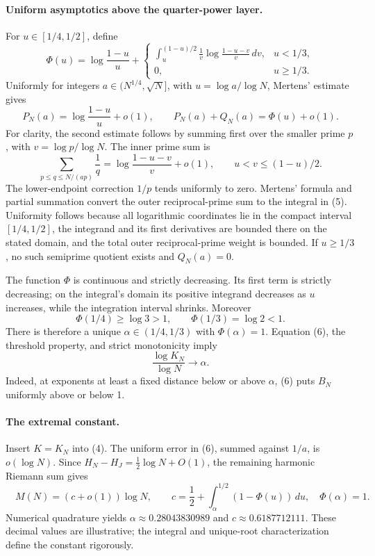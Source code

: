 \paragraph{Uniform asymptotics above the quarter-power layer.}
For \(u\in[1/4,1/2]\), define
\[
 \Phi(u)=\log\frac{1-u}{u}+
 \begin{cases}
 \displaystyle\int_u^{(1-u)/2}\frac1v
       \log\frac{1-u-v}{v}\,dv,&u<1/3,\\[4pt]
 0,&u\geq1/3.
 \end{cases} \tag{5}
\]
Uniformly for integers \(a\in(N^{1/4},\sqrt N]\), with \(u=\log a/\log N\), Mertens' estimate gives
\[
 P_N(a)=\log\frac{1-u}{u}+o(1),\qquad
 P_N(a)+Q_N(a)=\Phi(u)+o(1). \tag{6}
\]
For clarity, the second estimate follows by summing first over the smaller prime \(p\), with \(v=\log p/\log N\). The inner prime sum is
\[
 \sum_{p\leq q\leq N/(ap)}\frac1q
 =\log\frac{1-u-v}{v}+o(1),
 \qquad u<v\leq(1-u)/2.
\]
The lower-endpoint correction \(1/p\) tends uniformly to zero. Mertens' formula and partial summation convert the outer reciprocal-prime sum to the integral in (5). Uniformity follows because all logarithmic coordinates lie in the compact interval \([1/4,1/2]\), the integrand and its first derivatives are bounded there on the stated domain, and the total outer reciprocal-prime weight is bounded. If \(u\geq1/3\), no such semiprime quotient exists and \(Q_N(a)=0\).

The function \(\Phi\) is continuous and strictly decreasing. Its first term is strictly decreasing; on the integral's domain its positive integrand decreases as \(u\) increases, while the integration interval shrinks. Moreover
\[
 \Phi(1/4)\geq\log3>1,\qquad \Phi(1/3)=\log2<1.
\]
There is therefore a unique \(\alpha\in(1/4,1/3)\) with \(\Phi(\alpha)=1\). Equation (6), the threshold property, and strict monotonicity imply
\[
 \frac{\log K_N}{\log N}\longrightarrow\alpha.
\]
Indeed, at exponents at least a fixed distance below or above \(\alpha\), (6) puts \(B_N\) uniformly above or below 1.

\paragraph{The extremal constant.}
Insert \(K=K_N\) into (4). The uniform error in (6), summed against \(1/a\), is \(o(\log N)\). Since \(H_N-H_J=\tfrac12\log N+O(1)\), the remaining harmonic Riemann sum gives
\[
 \boxed{\quad
 M(N)=(c+o(1))\log N,\qquad
 c=\frac12+\int_\alpha^{1/2}(1-\Phi(u))\,du,
 \quad\Phi(\alpha)=1.\quad}
\]
Numerical quadrature yields \(\alpha\approx0.28043830989\) and \(c\approx0.6187712111\). These decimal values are illustrative; the integral and unique-root characterization define the constant rigorously.

